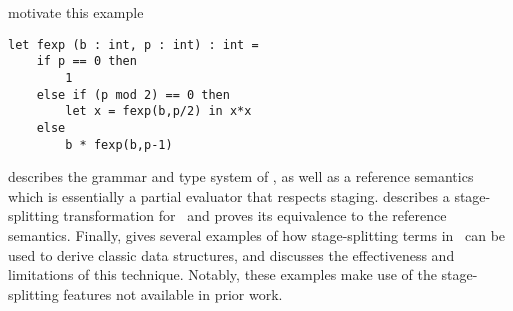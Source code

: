 \documentclass[preprint]{sigplanconf}
\begin{document}
\TODO motivate this example
\begin{lstlisting} 
let fexp (b : int, p : int) : int =
	if p == 0 then
		1
	else if (p mod 2) == 0 then
		let x = fexp(b,p/2) in x*x
	else
		b * fexp(b,p-1)	
\end{lstlisting}

 describes the grammar and type system of \lang, as well as a reference semantics which is essentially a partial evaluator that respects staging.  describes a stage-splitting transformation for \lang\ and proves its equivalence to the reference semantics.
Finally,  gives several examples of how stage-splitting terms in \lang\ can be used to derive classic data structures, and discusses the effectiveness and limitations of this technique.  Notably, these examples make use of the stage-splitting features not available in prior work.










\end{document}
